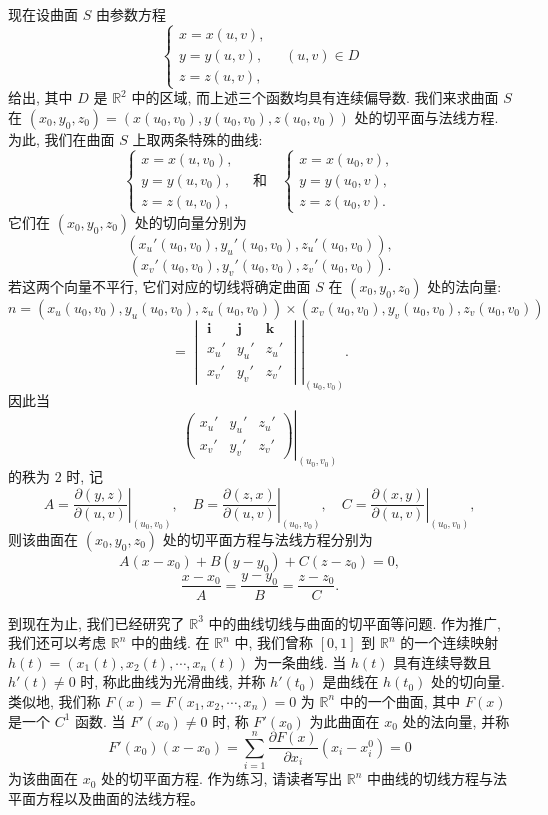 \documentclass[UTF8, 12pt, fontset=fandol, oneside]{ctexart}
\begin{document}
现在设曲面 $S$ 由参数方程
\[
  \begin{cases}
    x=x(u,v),\\
    y=y(u,v),\\
    z=z(u,v),
  \end{cases}
  \quad (u,v)\in D
\]
给出, 其中 $D$ 是 $\mathbb R^2$ 中的区域, 而上述三个函数均具有连续偏导数. 我们来求曲面 $S$ 在 $(x_0,y_0,z_0)=(x(u_0,v_0),y(u_0,v_0),z(u_0,v_0))$ 处的切平面与法线方程. 为此, 我们在曲面 $S$ 上取两条特殊的曲线:
\[
  \begin{cases}
    x=x(u,v_0),\\
    y=y(u,v_0),\\
    z=z(u,v_0),
  \end{cases}
  \quad\text{和}\quad
  \begin{cases}
    x=x(u_0,v),\\
    y=y(u_0,v),\\
    z=z(u_0,v).
  \end{cases}
\]
它们在 $(x_0,y_0,z_0)$ 处的切向量分别为
\[
  (x_u'(u_0,v_0),y_u'(u_0,v_0),z_u'(u_0,v_0)),
\]
\[
  (x_v'(u_0,v_0),y_v'(u_0,v_0),z_v'(u_0,v_0)).
\]
若这两个向量不平行, 它们对应的切线将确定曲面 $S$ 在 $(x_0,y_0,z_0)$ 处的法向量:
\[
  n=(x_u(u_0,v_0),y_u(u_0,v_0),z_u(u_0,v_0))
  \times(x_v(u_0,v_0),y_v(u_0,v_0),z_v(u_0,v_0))
\]
\[
  =
  \left.
  \begin{vmatrix}
    \mathbf i & \mathbf j & \mathbf k\\
    x_u' & y_u' & z_u'\\
    x_v' & y_v' & z_v'
  \end{vmatrix}
  \right|_{(u_0,v_0)}.
\]
因此当
\[
  \left.
  \begin{pmatrix}
    x_u' & y_u' & z_u'\\
    x_v' & y_v' & z_v'
  \end{pmatrix}
  \right|_{(u_0,v_0)}
\]
的秩为 $2$ 时, 记
\[
  A=\left.\frac{\partial(y,z)}{\partial(u,v)}\right|_{(u_0,v_0)},\quad
  B=\left.\frac{\partial(z,x)}{\partial(u,v)}\right|_{(u_0,v_0)},\quad
  C=\left.\frac{\partial(x,y)}{\partial(u,v)}\right|_{(u_0,v_0)},
\]
则该曲面在 $(x_0,y_0,z_0)$ 处的切平面方程与法线方程分别为
\[
  A(x-x_0)+B(y-y_0)+C(z-z_0)=0,
\]
\[
  \frac{x-x_0}{A}=\frac{y-y_0}{B}=\frac{z-z_0}{C}.
\]

到现在为止, 我们已经研究了 $\mathbb R^3$ 中的曲线切线与曲面的切平面等问题. 作为推广, 我们还可以考虑 $\mathbb R^n$ 中的曲线. 在 $\mathbb R^n$ 中, 我们曾称 $[0,1]$ 到 $\mathbb R^n$ 的一个连续映射 $h(t)=(x_1(t),x_2(t),\cdots,x_n(t))$ 为一条曲线. 当 $h(t)$ 具有连续导数且 $h'(t)\ne0$ 时, 称此曲线为光滑曲线, 并称 $h'(t_0)$ 是曲线在 $h(t_0)$ 处的切向量. 类似地, 我们称 $F(x)=F(x_1,x_2,\cdots,x_n)=0$ 为 $\mathbb R^n$ 中的一个曲面, 其中 $F(x)$ 是一个 $C^1$ 函数. 当 $F'(x_0)\ne0$ 时, 称 $F'(x_0)$ 为此曲面在 $x_0$ 处的法向量, 并称
\[
  F'(x_0)(x-x_0)
  =
  \sum_{i=1}^n \frac{\partial F(x)}{\partial x_i}(x_i-x_i^0)=0
\]
为该曲面在 $x_0$ 处的切平面方程. 作为练习, 请读者写出 $\mathbb R^n$ 中曲线的切线方程与法平面方程以及曲面的法线方程。
\end{document}

